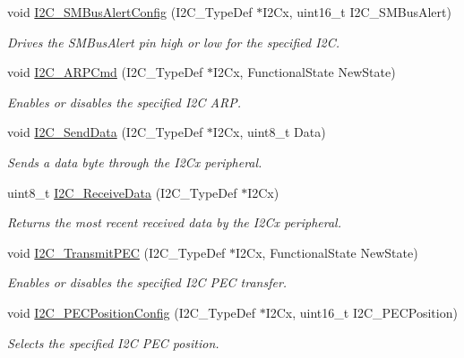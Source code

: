 \begin{DoxyCompactItemize}
void \mbox{\hyperlink{group___i2_c_ga75a810776d9710d2f6d9c5d9e93241c6}{I2\+C\+\_\+\+S\+M\+Bus\+Alert\+Config}} (I2\+C\+\_\+\+Type\+Def $\ast$I2\+Cx, uint16\+\_\+t I2\+C\+\_\+\+S\+M\+Bus\+Alert)
\begin{DoxyCompactList}\small\item\em Drives the S\+M\+Bus\+Alert pin high or low for the specified I2C. \end{DoxyCompactList}\item 
void \mbox{\hyperlink{group___i2_c_ga66d86742bf1be58b17ef8779ffc79d02}{I2\+C\+\_\+\+A\+R\+P\+Cmd}} (I2\+C\+\_\+\+Type\+Def $\ast$I2\+Cx, Functional\+State New\+State)
\begin{DoxyCompactList}\small\item\em Enables or disables the specified I2C A\+RP. \end{DoxyCompactList}\item 
void \mbox{\hyperlink{group___i2_c_ga7bd9e70b8eafde0dd5eb42b0d95fe1a9}{I2\+C\+\_\+\+Send\+Data}} (I2\+C\+\_\+\+Type\+Def $\ast$I2\+Cx, uint8\+\_\+t Data)
\begin{DoxyCompactList}\small\item\em Sends a data byte through the I2\+Cx peripheral. \end{DoxyCompactList}\item 
uint8\+\_\+t \mbox{\hyperlink{group___i2_c_gaeaaa4b6f77f50eb57465148c55d27fb2}{I2\+C\+\_\+\+Receive\+Data}} (I2\+C\+\_\+\+Type\+Def $\ast$I2\+Cx)
\begin{DoxyCompactList}\small\item\em Returns the most recent received data by the I2\+Cx peripheral. \end{DoxyCompactList}\item 
void \mbox{\hyperlink{group___i2_c_gaa27d1440290fe601e730b6980999afe3}{I2\+C\+\_\+\+Transmit\+P\+EC}} (I2\+C\+\_\+\+Type\+Def $\ast$I2\+Cx, Functional\+State New\+State)
\begin{DoxyCompactList}\small\item\em Enables or disables the specified I2C P\+EC transfer. \end{DoxyCompactList}\item 
void \mbox{\hyperlink{group___i2_c_ga5d0f939bdd45542502827bf408f24161}{I2\+C\+\_\+\+P\+E\+C\+Position\+Config}} (I2\+C\+\_\+\+Type\+Def $\ast$I2\+Cx, uint16\+\_\+t I2\+C\+\_\+\+P\+E\+C\+Position)
\begin{DoxyCompactList}\small\item\em Selects the specified I2C P\+EC position. \end{DoxyCompactList}\item 

\end{DoxyCompactItemize}
